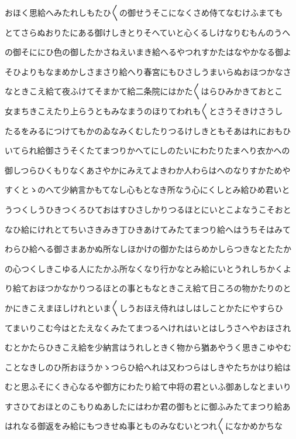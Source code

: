 \documentclass[a4paper,11pt,landscape]{ltjtarticle}
\begin{document}
おほく思給へみたれしもたひ〱の御せうそこになくさめ侍てなむけふまても
\par\medskip
とてさらぬおりたにある御けしきとりそへていと心くるしけなりむもんのうへ
\par\medskip
の御そににひ色の御したかさねえいまき給へるやつれすかたはなやかなる御よ
\par\medskip
そひよりもなまめかしさまさり給へり春宮にもひさしうまいらぬおほつかなさ
\par\medskip
なときこえ給て夜ふけてそまかて給二条院にはかた〱はらひみかきておとこ
\par\medskip
女まちきこえたり上らうともみなまうのほりてわれも〱とさうそきけさうし
\par\medskip
たるをみるにつけてもかのゐなみくむしたりつるけしきともそあはれにおもひ
\par\medskip
いてられ給御さうそくたてまつりかへてにしのたいにわたりたまへり衣かへの
\par\medskip
御しつらひくもりなくあさやかにみえてよきわか人わらはへのなりすかためや
\par\medskip
すくとゝのへて少納言かもてなし心もとなき所なう心にくしとみ給ひめ君いと
\par\medskip
うつくしうひきつくろひておはすひさしかりつるほとにいとこよなうこそおと
\par\medskip
なひ給にけれとてちいさきみき丁ひきあけてみたてまつり給へはうちそはみて
\par\medskip
わらひ給へる御さまあかぬ所なしほかけの御かたはらめかしらつきなとたたか
\par\medskip
の心つくしきこゆる人にたかふ所なくなり行かなとみ給にいとうれしちかくよ
\par\medskip
り給ておほつかなかりつるほとの事ともなときこえ給て日ころの物かたりのと
\par\medskip
かにきこえまほしけれといま〱しうおほえ侍れはしはしことかたにやすらひ
\par\medskip
てまいりこむ今はとたえなくみたてまつるへけれはいとはしうさへやおほされ
\par\medskip
むとかたらひきこえ給を少納言はうれしときく物から猶あやうく思きこゆやむ
\par\medskip
ことなきしのひ所おほうかゝつらひ給へれは又わつらはしきやたちかはり給は
\par\medskip
むと思ふそにくき心なるや御方にわたり給て中将の君といふ御あしなとまいり
\par\medskip
すさひておほとのこもりぬあしたにはわか君の御もとに御ふみたてまつり給あ
\par\medskip
はれなる御返をみ給にもつきせぬ事とものみなむいとつれ〱になかめかちな
\end{document}

